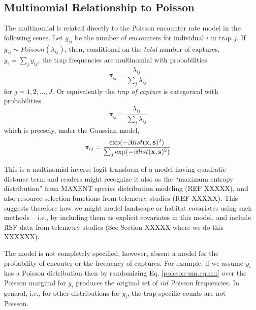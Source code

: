 \subsection{Multinomial Relationship to Poisson}

The multinomial is related directly to the Poisson encounter rate
model in the following sense. Let $y_{ij}$ be the number of
encounters for individual $i$ in trap $j$. If $y_{ij} \sim
Poisson(\lambda_{ij})$,
then, 
conditional on the {\it total}
number of captures, $y_{i} = \sum_{j} y_{ij}$, the trap frequencies are multinomial with
probabilities
\[
 \pi_{ij} =  \frac{ \lambda_{ij} } { \sum_{j} \lambda_{ij} } 
\]
for $j=1,2,\ldots,J$.
Or equivalently the {\it trap of
  capture} is categorical with probabilities
\[
 \pi_{ij} =  \frac{ \lambda_{ij} } { \sum_{j} \lambda_{ij} } 
\]
which is precsely, under the Gaussian model, 
\begin{equation} 
\pi_{ij} =  \frac{ \exp( - \beta \! dist({\bf x},{\bf s})^2 ) }  {
   \sum_{j} \exp(-\beta \! dist({\bf x},{\bf s})^2)}
\label{poisson-mn.eq.mnprobs}
\end{equation}

This is a multinomial inverse-logit transform of a model having
quadratic distance term and readers might recognize it
also as the ``maximum entropy distribution'' from MAXENT
species distribution modeling (REF XXXXX), and also resource selection functions
from telemetry studies (REF XXXXX). This suggests therefore how we might model
landscape or habitat covariates using such methods -- i.e., by
including them as explicit covariates in this model, and include
RSF data from telemetry studies (See Section XXXXX
where we do this XXXXXX).  

The model is not completely specified, however, absent a model for the
probability of encouter or the frequency of captures. For example, if
we assume $y_{i}$ has a Poisson distribution then by randomizing
Eq. \ref{poisson-mn.eq.mn}
over the Poisson marginal for 
$y_{i}$ produces the original set of $iid$ Poisson frequencies. In
general, i.e., for other distributions for $y_{i}$, the trap-specific
counts are not Poisson.


